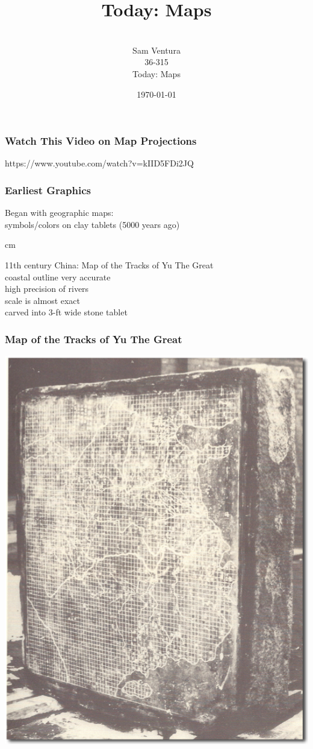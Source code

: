 \documentclass{beamer} %
\begin{document}
\title[dedup]{Today:  Maps}


\author[Samuel L. Ventura]{\\
  \large{Sam Ventura\\36-315\\Today:  Maps}}
\date{\today}


\begin{frame}
	\maketitle

	
\end{frame}



\begin{frame}\frametitle{Watch This Video on Map Projections}
	\centering
	
	https://www.youtube.com/watch?v=kIID5FDi2JQ
	
\end{frame}


\begin{frame}\frametitle{Earliest Graphics}
	\centering
	Began with geographic maps:  \\symbols/colors on clay tablets (5000 years ago)
	
	 cm
	
	11th century China:  Map of the Tracks of Yu The Great\\coastal outline very accurate\\high precision of rivers\\scale is almost exact\\carved into 3-ft wide stone tablet
	
\end{frame}



\begin{frame}\frametitle{Map of the Tracks of Yu The Great}
	\centering
	\includegraphics[width=0.6\linewidth]{yu2.png}
\end{frame}
\end{document}

